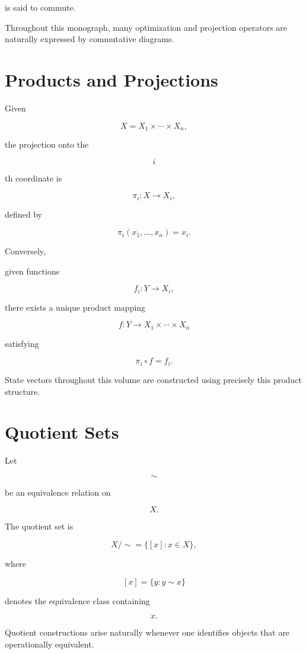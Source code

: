 \documentclass[11pt,fleqn]{book}
\numberwithin{equation}{chapter}
\theoremstyle{plain}
\theoremstyle{definition}
\theoremstyle{remark}
\begin{document}
is said to commute.

Throughout this monograph, many optimization and projection operators
are naturally expressed by commutative diagrams.


\section{Products and Projections}

Given

\[
X
=
X_1\times\cdots\times X_n,
\]

the projection onto the

\[
i
\]

th coordinate is

\[
\pi_i:X\rightarrow X_i,
\]

defined by

\[
\pi_i(x_1,\ldots,x_n)
=
x_i.
\]

Conversely,

given functions

\[
f_i:Y\rightarrow X_i,
\]

there exists a unique product mapping

\[
f:Y\rightarrow
X_1\times\cdots\times X_n
\]

satisfying

\[
\pi_i\circ f=f_i.
\]

State vectors throughout this volume are constructed using precisely
this product structure.


\section{Quotient Sets}

Let

\[
\sim
\]

be an equivalence relation on

\[
X.
\]

The quotient set is

\[
X/\!\sim
=
\{
[x]
:
x\in X
\},
\]

where

\[
[x]
=
\{y:y\sim x\}
\]

denotes the equivalence class containing

\[
x.
\]

Quotient constructions arise naturally whenever one identifies objects
that are operationally equivalent.
\end{document}
